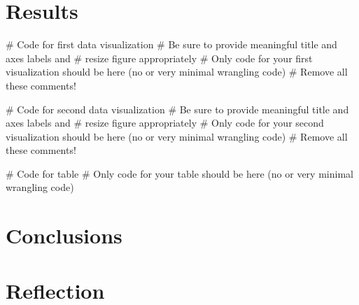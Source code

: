 \documentclass[
  letterpaper,
  DIV=11,
  numbers=noendperiod]{scrartcl}
\newenvironment{Shaded}{\begin{snugshade}}{\end{snugshade}}
\newcommand{\CommentTok}[1]{\textcolor[rgb]{0.37,0.37,0.37}{#1}}
\begin{document}
\hypertarget{results}{%
\section{Results}\label{results}}

\begin{Shaded}
\begin{Highlighting}[]
\CommentTok{\# Code for first data visualization}
\CommentTok{\# Be sure to provide meaningful title and axes labels and}
\CommentTok{\# resize figure appropriately}
\CommentTok{\# Only code for your first visualization should be here (no or very minimal wrangling code)}
\CommentTok{\# Remove all these comments!}
\end{Highlighting}
\end{Shaded}

\begin{Shaded}
\begin{Highlighting}[]
\CommentTok{\# Code for second data visualization}
\CommentTok{\# Be sure to provide meaningful title and axes labels and}
\CommentTok{\# resize figure appropriately}
\CommentTok{\# Only code for your second visualization should be here (no or very minimal wrangling code)}
\CommentTok{\# Remove all these comments!}
\end{Highlighting}
\end{Shaded}

\begin{Shaded}
\begin{Highlighting}[]
\CommentTok{\# Code for table}
\CommentTok{\# Only code for your table should be here (no or very minimal wrangling code)}
\end{Highlighting}
\end{Shaded}

\hypertarget{conclusions}{%
\section{Conclusions}\label{conclusions}}

\newpage

\hypertarget{reflection}{%
\section{Reflection}\label{reflection}}
\end{document}
